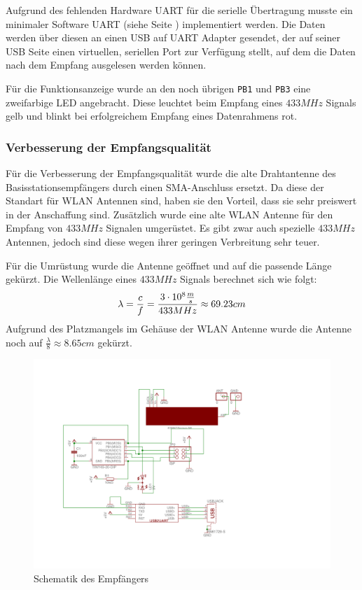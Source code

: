 \documentclass{report}
\begin{document}
Aufgrund des fehlenden Hardware UART für die serielle Übertragung musste ein minimaler Software UART (siehe Seite \pageref{SoftwareUart}) implementiert werden. Die Daten werden über diesen an einen USB auf UART Adapter gesendet, der auf seiner USB Seite einen virtuellen, seriellen Port zur Verfügung stellt, auf dem die Daten nach dem Empfang ausgelesen werden können.

Für die Funktionsanzeige wurde an den noch übrigen \verb+PB1+ und \verb+PB3+ eine zweifarbige LED angebracht. Diese leuchtet beim Empfang eines $433MHz$ Signals gelb und blinkt bei erfolgreichem Empfang eines Datenrahmens rot.

\subsubsection{Verbesserung der Empfangsqualität}
Für die Verbesserung der Empfangsqualität wurde die alte Drahtantenne des Basisstationsempfängers durch einen SMA-Anschluss ersetzt. Da diese der Standart für WLAN Antennen sind, haben sie den Vorteil, dass sie sehr preiswert in der Anschaffung sind. Zusätzlich wurde eine alte WLAN Antenne für den Empfang von $433MHz$ Signalen umgerüstet. Es gibt zwar auch spezielle $433MHz$ Antennen, jedoch sind diese wegen ihrer geringen Verbreitung sehr teuer.

Für die Umrüstung wurde die Antenne geöffnet und auf die passende Länge gekürzt. Die Wellenlänge eines $433MHz$ Signals berechnet sich wie folgt:
\begin{equation*}
    \lambda = \frac{c}{f} = \frac{3 \cdot 10\textsuperscript{8}\frac{m}{s}}{433MHz} \approx 69.23cm
\end{equation*}
Aufgrund des Platzmangels im Gehäuse der WLAN Antenne wurde die Antenne noch auf $\frac{\lambda}{8} \approx 8.65cm$ gekürzt.


\begin{figure}[!h]
    \begin{center}
        \includegraphics[width=13cm]{Bilder/board_schematic.pdf}
    \end{center}
    \caption{Schematik des Empfängers}
    \label{schematik}
\end{figure}
\end{document}

